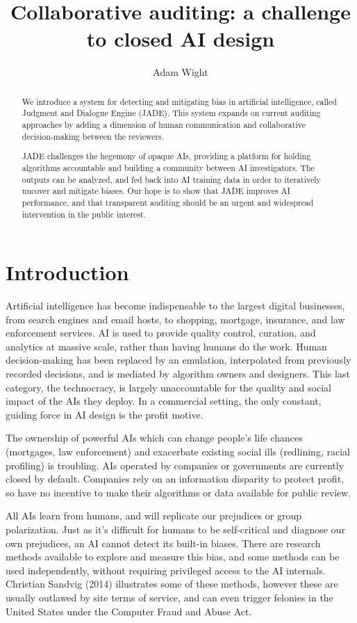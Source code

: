 \documentclass[format=sigconf, authorversion]{acmart}
\title{Collaborative auditing: a challenge to closed AI design}
\author{Adam Wight}
\affiliation{Wikimedia Foundation}
\begin{document}
\begin{abstract}
We introduce a system for detecting and mitigating bias in artificial intelligence, called Judgment and Dialogue Engine (JADE).  This system expands on current auditing approaches by adding a dimension of human communication and collaborative decision-making between the reviewers.

JADE challenges the hegemony of opaque AIs, providing a platform for holding algorithms accountable and building a community between AI investigators.  The outputs can be analyzed, and fed back into AI training data in order to iteratively uncover and mitigate biases.  Our hope is to show that JADE improves AI performance, and that transparent auditing should be an urgent and widespread intervention in the public interest.
\end{abstract}

\maketitle

\section{Introduction}

Artificial intelligence has become indispensable to the largest digital businesses, from search engines and email hosts, to shopping, mortgage, insurance, and law enforcement services.  AI is used to provide quality control, curation, and analytics at massive scale, rather than having humans do the work.  Human decision-making has been replaced by an emulation, interpolated from previously recorded decisions, and is mediated by algorithm owners and designers.  This last category, the technocracy, is largely unaccountable for the quality and social impact of the AIs they deploy.  In a commercial setting, the only constant, guiding force in AI design is the profit motive.

The ownership of powerful AIs which can change people's life chances (mortgages, law enforcement) and exacerbate existing social ills (redlining, racial profiling) is troubling.  AIs operated by companies or governments are currently closed by default.  Companies rely on an information disparity to protect profit, so have no incentive to make their algorithms or data available for public review.

All AIs learn from humans, and will replicate our prejudices or group polarization.  Just as it's difficult for humans to be self-critical and diagnose our own prejudices, an AI cannot detect its built-in biases.  There are research methods available to explore and measure this bias, and some methods can be used independently, without requiring privileged access to the AI internals.  Christian Sandvig (2014) illustrates some of these methods, however these are usually outlawed by site terms of service, and can even trigger felonies in the United States under the Computer Fraud and Abuse Act.
\end{document}
